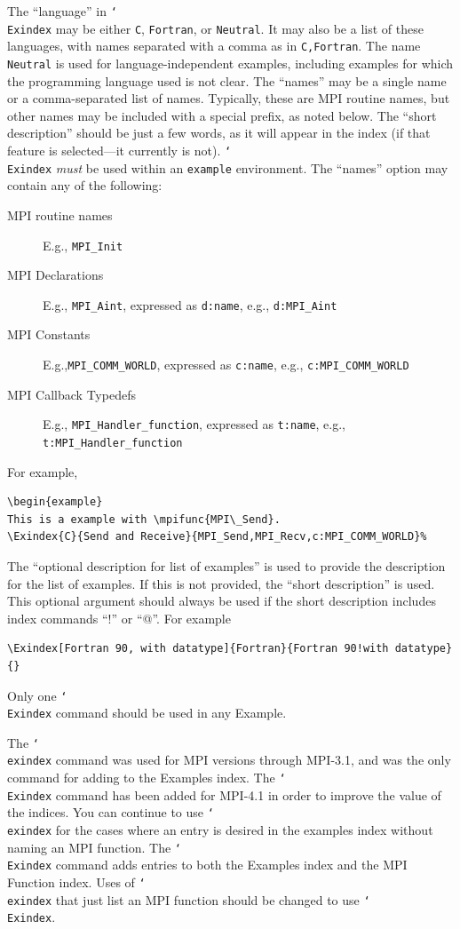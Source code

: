 \documentclass[letterpaper,twoside,11pt,fleqn]{article}
\def\cmd#1{\texttt{\char`\\#1}}
\def\MPI/{\textsf{MPI}}    %
\def\flushline{\hfill\hbox{}\linebreak}
\begin{document}
The ``language'' in \cmd{Exindex} may be either \texttt{C},
\texttt{Fortran}, or \texttt{Neutral}.
It may also be a list of these languages, with names separated with a comma as
in \texttt{C,Fortran}.
The name \texttt{Neutral} is used for language-independent examples,
including examples for which the programming language used is not clear.
The ``names'' may be a single name or a comma-separated
list of names. Typically, these are \MPI/ routine names, but other
names may be included with a special prefix, as noted below.
The ``short description'' should be just a few words, as it will
appear in the index (if that feature is selected---it currently is not).
\cmd{Exindex} \emph{must} be used within an \texttt{example}
environment.
The ``names'' option may contain any of the following:
\begin{description}
\item[\MPI/ routine names]E.g., \texttt{MPI\_Init}
\item[\MPI/ Declarations]E.g., \texttt{MPI\_Aint}, expressed as
  \texttt{d:name}, e.g., \texttt{d:MPI\_Aint}
\item[\MPI/ Constants]E.g.,\texttt{MPI\_COMM\_WORLD}, expressed as
  \texttt{c:name}, e.g., \texttt{c:MPI\_COMM\_WORLD}
\item[\MPI/ Callback Typedefs]E.g., \texttt{MPI\_Handler\_function},
  expressed as \texttt{t:name}, e.g.,\flushline
  \texttt{t:MPI\_Handler\_function}
\end{description}
For example,
\begin{verbatim}
\begin{example}
This is a example with \mpifunc{MPI\_Send}.
\Exindex{C}{Send and Receive}{MPI_Send,MPI_Recv,c:MPI_COMM_WORLD}%
\end{verbatim}
The ``optional description for list of examples'' is used to provide
the description for the list of examples. If this is not provided, the
``short description'' is used.
This optional argument should always be used if the short description
includes index commands ``!'' or ``@''. For example
\begin{verbatim}
\Exindex[Fortran 90, with datatype]{Fortran}{Fortran 90!with datatype}{}
\end{verbatim}
Only one \cmd{Exindex} command should be used in any Example.

The \cmd{exindex} command was used for \MPI/ versions through
\MPI/-3.1, and was the only command for adding to the Examples index.
The \cmd{Exindex} command has been added for
\MPI/-4.1 in order to improve the value of the indices.
You can continue to use \cmd{exindex} for the cases where an entry is
desired in the examples index without naming an MPI function.
The \cmd{Exindex} command adds entries to both the Examples index and
the MPI Function index.
Uses of \cmd{exindex} that just list an \MPI/ function should be
changed to use \cmd{Exindex}.
\end{document}
